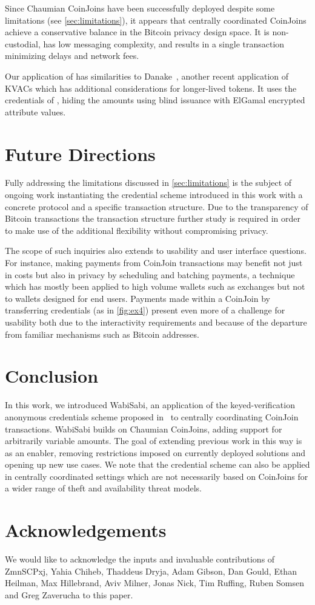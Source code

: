 \documentclass[a4paper]{article}
\begin{document}
Since Chaumian CoinJoins have been successfully deployed despite some limitations (see \cref{sec:limitations}), it appears that centrally coordinated CoinJoins achieve a conservative balance in the Bitcoin privacy design space. It is non-custodial, has low messaging complexity, and results in a single transaction minimizing delays and network fees.

Our application of \cite{chase2019signal} has similarities to Danake~\cite{devalence2020danake}, another recent application of KVACs which has additional considerations for longer-lived tokens. It uses the credentials of \cite{chase2014algebraic}, hiding the amounts using blind issuance with ElGamal encrypted attribute values.

\section{Future Directions} \label{sec:futuredirections}

Fully addressing the limitations discussed in \cref{sec:limitations} is the subject of ongoing work instantiating the credential scheme introduced in this work with a concrete protocol and a specific transaction structure. Due to the transparency of Bitcoin transactions the transaction structure further study is required in order to make use of the additional flexibility without compromising privacy.

The scope of such inquiries also extends to usability and user interface questions. For instance, making payments from CoinJoin transactions may benefit not just in costs but also in privacy by scheduling and batching payments, a technique which has mostly been applied to high volume wallets such as exchanges but not to wallets designed for end users. Payments made within a CoinJoin by transferring credentials (as in \cref{fig:ex4}) present even more of a challenge for usability both due to the interactivity requirements and because of the departure from familiar mechanisms such as Bitcoin addresses.

\section{Conclusion}\label{sec:conclusion}
In this work, we introduced WabiSabi, an application of the keyed-verification anonymous credentials scheme proposed in~\cite{chase2019signal} to centrally coordinating CoinJoin transactions. WabiSabi builds on Chaumian CoinJoins, adding support for arbitrarily variable amounts. The goal of extending previous work in this way is as an enabler, removing restrictions imposed on currently deployed solutions and opening up new use cases. We note that the credential scheme can also be applied in centrally coordinated settings which are not necessarily based on CoinJoins for a wider range of theft and availability threat models.

\section*{Acknowledgements}

We would like to acknowledge the inputs and invaluable contributions of ZmnSCPxj, Yahia Chiheb, Thaddeus Dryja, Adam Gibson, Dan Gould, Ethan Heilman, Max Hillebrand, Aviv Milner, Jonas Nick, Tim Ruffing, Ruben Somsen and Greg Zaverucha to this paper.
\printbibliography
\end{document}
